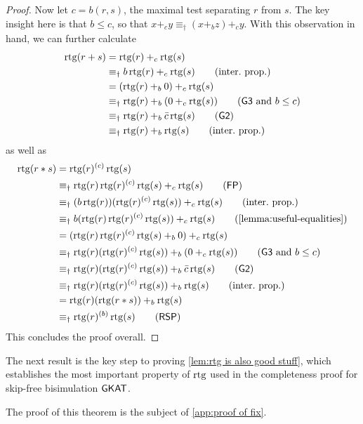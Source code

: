 \documentclass[orivec,envcountsect,envcountsame]{llncs}
\begin{document}
\begin{proof}
	Now let \(c = b(r, s)\), the maximal test separating \(r\) from \(s\).
	The key insight here is that \(b \le c\), so that \(x +_c y \equiv_{\dagger} (x +_b z) +_c y\).
	With this observation in hand, we can further calculate
	\begin{align*}
		\rtg(r + s)
		&= \rtg(r) +_c \rtg(s)  \\
		&\equiv_\dagger b\rtg(r) +_c \rtg(s) \tag{inter.~prop.} \\
		&= (\rtg(r) +_b 0) +_c \rtg(s)\\
		&\equiv_\dagger \rtg(r) +_b (0 +_c \rtg(s)) \tag{\textsf{G3} and $b \leq c$}\\ %
		&\equiv_\dagger \rtg(r) +_b \bar c\rtg(s) \tag{\textsf{G2}}\\
		&\equiv_\dagger \rtg(r) +_b \rtg(s) \tag{inter.~prop.}
	\end{align*}
	as well as
	\begin{align*}
		\rtg(r * s)
		&= \rtg(r)^{(c)} \rtg(s)  \\
		&\equiv_\dagger \rtg(r)\rtg(r)^{(c)}\rtg(s) +_c \rtg(s)  \tag{\textsf{FP}}\\
		&\equiv_\dagger (b\rtg(r))(\rtg(r)^{(c)} \rtg(s)) +_c \rtg(s) \tag{inter.~prop.}\\
		&\equiv_\dagger b(\rtg(r)\rtg(r)^{(c)} \rtg(s)) +_c \rtg(s) \tag{\cref{lemma:useful-equalities}}\\
		&= (\rtg(r)\rtg(r)^{(c)} \rtg(s) +_b 0) +_c \rtg(s) \\
		&\equiv_\dagger \rtg(r)(\rtg(r)^{(c)} \rtg(s)) +_b (0 +_c \rtg(s))\tag{\textsf{G3} and $b \leq c$}\\ %
		&\equiv_\dagger \rtg(r)(\rtg(r)^{(c)} \rtg(s)) +_b \bar c\rtg(s) \tag{\textsf{G2}}\\
		&\equiv_\dagger \rtg(r)(\rtg(r)^{(c)} \rtg(s)) +_b \rtg(s) \tag{inter.~prop.}\\
		&= \rtg(r)(\rtg(r * s)) +_b \rtg(s)\\
		&\equiv_\dagger \rtg(r) \while b \rtg(s) \tag{\textsf{RSP}}
	\end{align*}
	This concludes the proof overall.
\end{proof}

The next result is the key step to proving \cref{lem:rtg is also good stuff}, which establishes the most important property of \(\operatorname{rtg}\) used in the completeness proof for skip-free bisimulation \(\textsf{GKAT}\).

\restatedetproofthm*

The proof of this theorem is the subject of \cref{app:proof of fix}.
\end{document}

